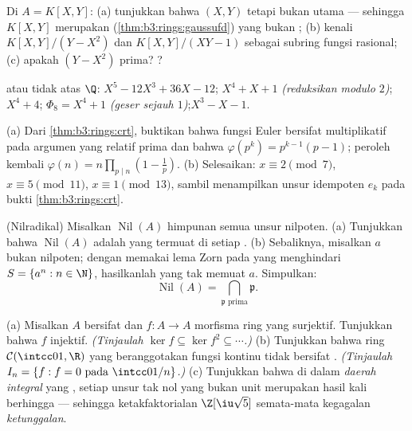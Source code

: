 \begin{exercise}[$\star\star$]\label{exo:b3:rings:6}
Di $A = K[X, Y]$: (a) tunjukkan bahwa  $(X, Y)$  tetapi
bukan  utama --- sehingga $K[X,Y]$ merupakan 
(\cref{thm:b3:rings:gaussufd}) yang bukan ; (b) kenali
$K[X, Y]/(Y - X^2)$ dan $K[X,Y]/(XY - 1)$ sebagai subring fungsi
rasional; (c) apakah $(Y - X^2)$ prima? ?
\end{exercise}

\begin{exercise}[$\star\star$]\label{exo:b3:rings:7}
 atau tidak atas $\Q$: $X^5 - 12X^3 + 36X - 12$;\quad
$X^4 + X + 1$ \emph{(reduksikan modulo $2$)};\quad $X^4 + 4$;\quad
$\Phi_8 = X^4 + 1$ \emph{(geser sejauh $1$)};\quad $X^3 - X - 1$.
\end{exercise}

\begin{exercise}[$\star\star$]\label{exo:b3:rings:8}
(a) Dari \cref{thm:b3:rings:crt}, buktikan bahwa fungsi Euler bersifat
multiplikatif pada argumen yang relatif prima dan bahwa $\varphi(p^k) =
p^{k-1}(p-1)$; peroleh kembali $\varphi(n) = n\prod_{p \mid n}(1 -
\frac1p)$.
(b) Selesaikan: $x \equiv 2 \pmod 7$, $x \equiv 5 \pmod{11}$, $x
\equiv 1 \pmod{13}$, sambil menampilkan unsur idempoten $e_k$ pada
bukti \cref{thm:b3:rings:crt}.
\end{exercise}

\begin{exercise}[$\star\star\star$]\label{exo:b3:rings:9}
(Nilradikal) Misalkan $\operatorname{Nil}(A)$ himpunan semua
unsur nilpoten. (a) Tunjukkan bahwa $\operatorname{Nil}(A)$ adalah
 yang termuat di setiap . (b) Sebaliknya, misalkan $a$
bukan nilpoten; dengan memakai lema Zorn pada  yang menghindari $S =
\{a^n : n \in \N\}$, hasilkanlah  yang tak memuat $a$.
Simpulkan:
\[
\operatorname{Nil}(A) = \bigcap_{\mathfrak p \text{ prima}}
\mathfrak p .
\]
\end{exercise}

\begin{exercise}[$\star\star\star$]\label{exo:b3:rings:10}
(a) Misalkan $A$ bersifat  dan $f \colon A \to A$ morfisma ring
yang surjektif. Tunjukkan bahwa $f$ injektif. \emph{(Tinjaulah $\ker
f \subseteq \ker f^2 \subseteq \cdots$.)}
(b) Tunjukkan bahwa ring $\mathcal C(\intcc01, \R)$ yang beranggotakan fungsi
kontinu tidak bersifat . \emph{(Tinjaulah $I_n = \{f : f = 0
\text{ pada } \intcc0{1/n}\}$.)}
(c) Tunjukkan bahwa di dalam \emph{daerah integral} yang , setiap unsur tak nol
yang bukan unit merupakan hasil kali berhingga  --- sehingga
ketakfaktorialan $\Z[\iu\sqrt 5]$ semata-mata kegagalan
\emph{ketunggalan}.
\end{exercise}

